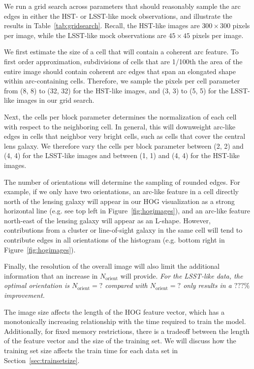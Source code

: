 \documentclass{emulateapj}
\newcommand{\wording}[1]{{\it\color{purple} #1}}
\begin{document}
We run a grid search across parameters that should reasonably sample
the arc edges in either the HST- or LSST-like mock observations, and
illustrate the results in Table~\ref{tab:gridsearch}.  Recall, the
HST-like images are $300\times300$ pixels per image, while the
LSST-like mock observations are $45\times45$ pixels per image.

We first estimate the size of a cell that will contain a coherent arc
feature.  To first order approximation, subdivisions of cells that are
1/100th the area of the entire image should contain coherent arc edges
that span an elongated shape within arc-containing cells.  Therefore,
we sample the pixels per cell parameter from (8, 8) to (32, 32) for
the HST-like images, and (3, 3) to (5, 5) for the LSST-like images in
our grid search.

Next, the cells per block parameter determines the normalization of
each cell with respect to the neighboring cell.  In general, this will
downweight arc-like edges in cells that neighbor very bright cells,
such as cells that cover the central lens galaxy.  We therefore vary
the cells per block parameter between (2, 2) and (4, 4) for the
LSST-like images and between (1, 1) and (4, 4) for the HST-like
images.

The number of orientations will determine the sampling of rounded
edges.  For example, if we only have two orientations, an arc-like
feature in a cell directly north of the lensing galaxy will appear in
our HOG visualization as a strong horizontal line (e.g. see top left
in Figure~\ref{fig:hogimages}), and an arc-like feature north-east of
the lensing galaxy will appear as an L-shape.  However, contributions
from a cluster or line-of-sight galaxy in the same cell will tend to
contribute edges in all orientations of the histogram (e.g. bottom
right in Figure~\ref{fig:hogimages}).  

Finally, the resolution of the overall image will also limit the
additional information that an increase in $N_\text{orient}$ will
provide.  \wording{For the LSST-like data, the optimal orientation is
  $N_\text{orient}=?$ compared with $N_\text{orient}=?$ only results
  in a $???\%$ improvement.}

The image size affects the length of the HOG feature vector, which has
a monotonically increasing relationship with the time required to
train the model.  Additionally, for fixed memory restrictions, there
is a tradeoff between the length of the feature vector and the size of
the training set.  We will discuss how the training set size affects
the train time for each data set in Section~\ref{sec:trainsetsize}.
\end{document}
